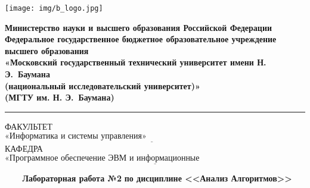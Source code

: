 \documentclass{bmstu}
\begin{document}
\renewcommand{\thelstlisting}{\arabic{lstlisting}}

\begin{titlepage}
	\fontsize{12pt}{12pt}\selectfont
	\noindent \begin{minipage}{0.15\textwidth}
		\texttt{[image: img/b\_logo.jpg]}
	\end{minipage}
	\noindent\begin{minipage}{0.9\textwidth}\centering
		\textbf{Министерство науки и высшего образования Российской Федерации}\\
		\textbf{Федеральное государственное бюджетное образовательное учреждение высшего образования}\\
		\textbf{«Московский государственный технический университет имени Н. Э.~Баумана}\\
		\textbf{(национальный исследовательский университет)»}\\
		\textbf{(МГТУ им. Н. Э.~Баумана)}
	\end{minipage}

	\noindent\rule{18cm}{3pt}
	\newline\newline
	\noindent ФАКУЛЬТЕТ $\underline{\text{«Информатика и системы управления»~~~~~~~~~~~~~~~~~~~~~~~~~~~~~~~~~~~~~~~~~~~~~~~~~~~~~~~}}$ \newline\newline
	\noindent КАФЕДРА $\underline{\text{«Программное обеспечение ЭВМ и информационные технологии»~~~~~~~~~~~~~~~~~~~~~~~}}$\newline\newline\newline\newline\newline\newline\newline


	\begin{center}
		\noindent\begin{minipage}{1.3\textwidth}\centering
		\Large\textbf{   ~~~ Лабораторная работа №2}\newline
		\textbf{по дисциплине <<Анализ Алгоритмов>>}\newline\newline\newline
		\end{minipage}
	\end{center}


\end{titlepage}
\end{document}
